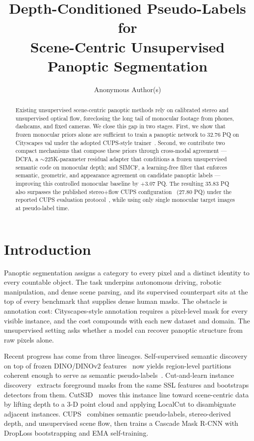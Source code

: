\documentclass{article}
\title{Depth-Conditioned Pseudo-Labels for \\ Scene-Centric Unsupervised Panoptic Segmentation}
\author{Anonymous Author(s)}
\begin{document}
\raggedbottom

\maketitle

\begin{abstract}
Existing unsupervised scene-centric panoptic methods rely on calibrated stereo and unsupervised optical flow, foreclosing the long tail of monocular footage from phones, dashcams, and fixed cameras. We close this gap in two stages. First, we show that frozen monocular priors alone are sufficient to train a panoptic network to 32.76 PQ on Cityscapes val under the adopted CUPS-style trainer~\cite{hahn2025cups}. Second, we contribute two compact mechanisms that compose these priors through cross-modal agreement --- DCFA, a $\sim$225K-parameter residual adapter that conditions a frozen unsupervised semantic code on monocular depth; and SIMCF, a learning-free filter that enforces semantic, geometric, and appearance agreement on candidate panoptic labels --- improving this controlled monocular baseline by $+3.07$ PQ. The resulting 35.83 PQ also surpasses the published stereo+flow CUPS configuration~\cite{hahn2025cups} (27.80 PQ) under the reported CUPS evaluation protocol~\cite{hahn2025cups}, while using only single monocular target images at pseudo-label time.
\end{abstract}

\section{Introduction}
\label{sec:intro}

Panoptic segmentation assigns a category to every pixel and a distinct identity to every countable object. The task underpins autonomous driving, robotic manipulation, and dense scene parsing, and its supervised counterpart sits at the top of every benchmark that supplies dense human masks. The obstacle is annotation cost: Cityscapes-style annotation requires a pixel-level mask for every visible instance, and the cost compounds with each new dataset and domain. The unsupervised setting asks whether a model can recover panoptic structure from raw pixels alone.

Recent progress has come from three lineages. Self-supervised semantic discovery on top of frozen DINO/DINOv2 features~\cite{caron2021dino,oquab2024dinov2} now yields region-level partitions coherent enough to serve as semantic pseudo-labels~\cite{hamilton2022stego,kim2024cause}. Cut-and-learn instance discovery~\cite{simeoni2021lost,wang2023tokencut,wang2023cutler} extracts foreground masks from the same SSL features and bootstraps detectors from them. CutS3D~\cite{sick2025cuts3d} moves this instance line toward scene-centric data by lifting depth to a 3-D point cloud and applying LocalCut to disambiguate adjacent instances. CUPS~\cite{hahn2025cups} combines semantic pseudo-labels, stereo-derived depth, and unsupervised scene flow, then trains a Cascade Mask R-CNN with DropLoss bootstrapping and EMA self-training.
\end{document}
